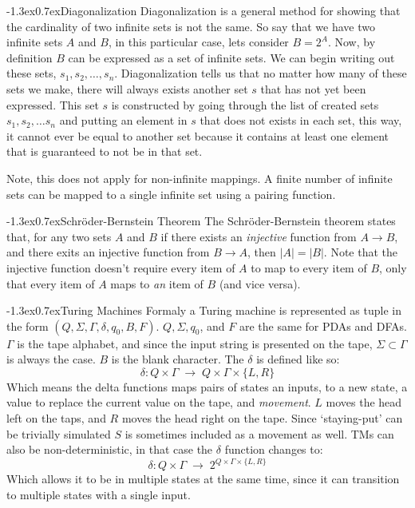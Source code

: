 \documentclass[10pt,landscape]{article}
\makeatletter
\renewcommand{\section}{\@startsection{section}{1}{0pt}%
                        {-1.3ex}{0.7ex}{\normalfont\large\bfseries}}
\renewcommand{\subsection}{\@startsection{subsection}{2}{0pt}%
                           {-1.3ex}{0.7ex}{\normalfont\normalsize\bfseries}}
\newcommand{\spto}{\;\to\;}
\makeatother
\begin{document}
\begin{multicols*}{3}
\subsection{Diagonalization}
Diagonalization is a general method for showing that the cardinality of
two infinite sets is not the same. So say that we have two infinite sets $A$ and $B$,
in this particular case, lets consider $B = 2^A$. Now, by definition $B$ can
be expressed as a set of infinite sets. We can begin writing out these sets,
$s_1, s_2, \ldots, s_n$. Diagonalization tells us that no matter how many
of these sets we make, there will always exists another set $s$ that has not yet
been expressed. This set $s$ is constructed by going through the list of created
sets $s_1, s_2, \ldots s_n$ and putting an element in $s$ that does not exists in
each set, this way, it cannot ever be equal to another set because it
contains at least one element that is guaranteed to not be in that set.

Note, this does not apply for non-infinite mappings. A finite number of infinite
sets can be mapped to a single infinite set using a pairing function.

\subsection{Schr\"{o}der-Bernstein Theorem}
The Schr\"{o}der-Bernstein theorem states that, for any two sets $A$ and $B$
if there exists an \textit{injective} function from $A \to B$, and
there exits an injective function from $B \to A$, then $|A| = |B|$.
Note that the injective function doesn't require every item of $A$ to map
to every item of $B$, only that every item of $A$ maps to \textit{an} item
of $B$ (and vice versa).

\section{Turing Machines}
Formaly a Turing machine is represented as tuple in the form 
$(Q, \Sigma, \Gamma, \delta, q_0, B, F)$. $Q, \Sigma, q_0$, and $F$ are the same
for PDAs and DFAs. $\Gamma$ is the tape alphabet, and since the input string
is presented on the tape, $\Sigma \subset \Gamma$ is always the case. $B$ is
the blank character. The $\delta$ is defined like so:
\[
    \delta : Q \times \Gamma \spto Q \times \Gamma \times \{L, R\}
\]
Which means the delta functions maps pairs of states an inputs, to a new state,
a value to replace the current value on the tape, and \textit{movement}. $L$ moves
the head left on the taps, and $R$ moves the head right on the tape. Since `staying-put'
can be trivially simulated $S$ is sometimes included as a movement as well. TMs
can also be non-deterministic, in that case the $\delta$ function changes to:
\[
    \delta : Q \times \Gamma \spto 2^{Q \times \Gamma \times \{L, R\}}
\]
Which allows it to be in multiple states at the same time, since it can transition
to multiple states with a single input.


\end{multicols*}
\end{document}
